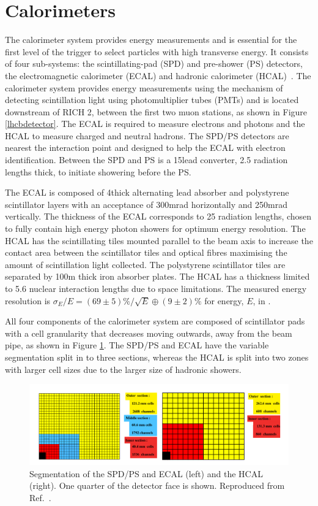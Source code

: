 \section{Calorimeters}

The calorimeter system provides energy measurements and is essential for the first level of the trigger to select particles with high transverse energy. It consists of four sub-systems: the scintillating-pad (SPD) and pre-shower (PS) detectors, the electromagnetic calorimeter (ECAL) and hadronic calorimeter (HCAL)~\cite{LHCb-DP-2013-004}. The calorimeter system provides energy measurements using the mechanism of detecting scintillation light using photomultiplier tubes (PMTs) and is located downstream of RICH 2, between the first two muon stations, as shown in Figure \ref{lhcbdetector}. The ECAL is required to measure electrons and photons and the HCAL to measure charged and neutral hadrons.  The SPD/PS detectors are nearest the interaction point and designed to help the ECAL with electron identification. Between the SPD and PS is a 15\mm lead converter, 2.5 radiation lengths thick, to initiate showering before the PS. 

The ECAL is composed of 4\mm thick alternating lead absorber and polystyrene scintillator layers with an acceptance of 300mrad horizontally and 250mrad vertically. The thickness of the ECAL corresponds to 25 radiation lengths, chosen to fully contain high energy photon showers for optimum energy resolution. The HCAL has the scintillating tiles mounted parallel to the beam axis to increase the contact area between the scintillator tiles and optical fibres maximising the amount of scintillation light collected. The polystyrene scintillator tiles are separated by 100m thick iron absorber plates. The HCAL has a thickness limited to 5.6 nuclear interaction lengths due to space limitations. The measured energy resolution is $\sigma_E/E = (69 \pm 5)\%/\sqrt{E} \oplus (9 \pm 2)\%$ for energy, $E$, in \gev.

All four components of the calorimeter system are composed of scintillator pads with a cell granularity that decreases moving outwards, away from the beam pipe, as shown in Figure \ref{calorimeter}. The SPD/PS and ECAL have the variable segmentation split in to three sections, whereas the HCAL is split into two zones with larger cell sizes due to the larger size of hadronic showers.

\begin{figure}
\includegraphics[width=\linewidth]{figures/detector/calorimeters.pdf}
\caption{Segmentation of the SPD/PS and ECAL (left) and the HCAL (right). One quarter of the detector face is shown. Reproduced from Ref.~\cite{lhcbdetector2008}.}
\label{calorimeter}
\end{figure}

